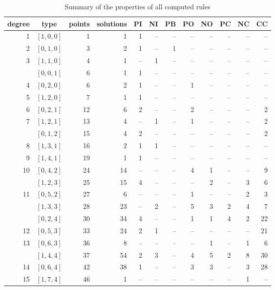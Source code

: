 \documentclass{article}
\begin{document}
\begin{table}
\centering
\caption{Summary of the properties of all computed rules}\label{tab:rulesummary}
\begin{tabular}{rcrrrrrrrrrr}
\toprule
degree & type & points & solutions & PI & NI & PB & PO & NO & PC & NC & CC \\
\midrule
  1 & $[1,0,0]$ &  1 &  1   &  1 & -- & -- & -- & -- & -- & -- & -- \\
  2 & $[0,1,0]$ &  3 &  2   &  1 & -- &  1 & -- & -- & -- & -- & -- \\
  3 & $[1,1,0]$ &  4 &  1   & -- &  1 & -- & -- & -- & -- & -- & -- \\
    & $[0,0,1]$ &  6 &  1   &  1 & -- & -- & -- & -- & -- & -- & -- \\
  4 & $[0,2,0]$ &  6 &  2   &  1 & -- & -- &  1 & -- & -- & -- & -- \\
  5 & $[1,2,0]$ &  7 &  1   &  1 & -- & -- & -- & -- & -- & -- & -- \\
  6 & $[0,2,1]$ & 12 &  6   &  2 & -- & -- &  2 & -- & -- & -- &  2 \\
  7 & $[1,2,1]$ & 13 &  4   & -- &  1 & -- &  1 & -- & -- & -- &  2 \\
    & $[0,1,2]$ & 15 &  4   &  2 & -- & -- & -- & -- & -- & -- &  2 \\
  8 & $[1,3,1]$ & 16 &  2   &  1 &  1 & -- & -- & -- & -- & -- & -- \\
  9 & $[1,4,1]$ & 19 &  1   &  1 & -- & -- & -- & -- & -- & -- & -- \\
 10 & $[0,4,2]$ & 24 & 14   & -- & -- & -- &  4 &  1 & -- & -- &  9 \\
    & $[1,2,3]$ & 25 & 15   &  4 & -- & -- & -- &  2 & -- &  3 &  6 \\
 11 & $[0,5,2]$ & 27 &  6   & -- & -- & -- &  1 & -- & -- &  2 &  3 \\
    & $[1,3,3]$ & 28 & 23   & -- &  2 & -- &  5 &  3 &  2 &  4 &  7 \\
    & $[0,2,4]$ & 30 & 34   &  4 & -- & -- &  1 &  1 &  4 &  2 & 22 \\
 12 & $[0,5,3]$ & 33 & 24   &  2 &  1 & -- & -- & -- & -- & -- & 21 \\
 13 & $[0,6,3]$ & 36 &  8   & -- & -- & -- & -- &  1 & -- &  1 &  6 \\
    & $[1,4,4]$ & 37 & 54   &  2 &  3 & -- &  4 &  5 &  2 &  8 & 30 \\
 14 & $[0,6,4]$ & 42 & 38   &  1 & -- & -- &  3 &  3 & -- &  3 & 28 \\
 15 & $[1,7,4]$ & 46 &  1   & -- & -- & -- & -- & -- & -- &  1 & -- \\
\bottomrule
\end{tabular}
\end{table}
\end{document}

